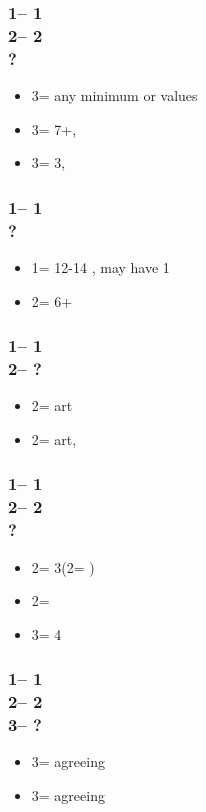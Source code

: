 \documentclass[12pt, a4paper]{article}
\begin{document}
\subsubsection*{1\diams -- 1\hearts\\
                2\diams -- 2\nt \\ ?}
\begin{itemize}
    \item 3\clubs = any minimum or \clubs values
    \item 3\diams = 7+\diams, \gf
    \item 3\hearts = 3\hearts, \gf
\end{itemize}

\subsubsection*{1\diams -- 1\spades\\ ?}
\begin{itemize}
    \item 1\nt = 12-14 \bal, may have 1\spades
    \item 2\diams = 6+\diams
\end{itemize}

\subsubsection*{1\diams -- 1\spades\\
                2\diams -- ?}
\begin{itemize}
    \item 2\hearts = \gf art \vimp
    \item 2\nt = \inv art, \fton{3\diams}
\end{itemize}

\subsubsection*{1\diams -- 1\spades\\
                2\diams -- 2\hearts \\ ?}
\begin{itemize}
    \item 2\spades = 3\spades (2\nt = \lsf)
    \item 2\nt = \nat
    \item 3\clubs = 4\hearts \vimp
\end{itemize}

\subsubsection*{1\diams -- 1\spades\\
                2\diams -- 2\hearts \\
                3\clubs -- ?}
\begin{itemize}
    \item 3\diams = agreeing \diams
    \item 3\hearts = agreeing \hearts
\end{itemize}
\end{document}
